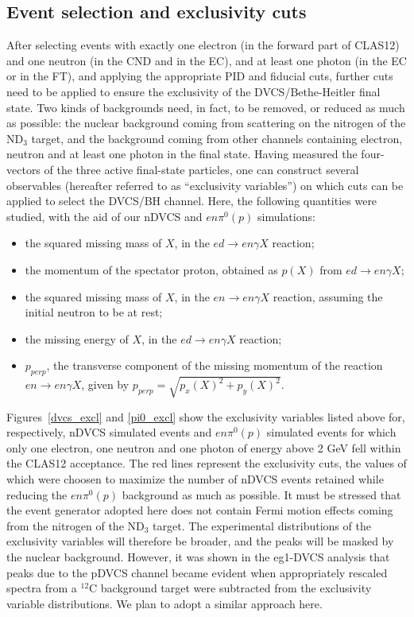 \subsection{Event selection and exclusivity cuts}\label{sec_excl_cuts}
After selecting events with exactly one electron (in the forward part of CLAS12) and one neutron (in the CND and in the EC), and at least one photon (in the EC or in the FT), and applying the appropriate PID and fiducial cuts, further cuts need to be applied to ensure the exclusivity of the DVCS/Bethe-Heitler final state. Two kinds of backgrounds need, in fact, to be removed, or reduced as much as possible: the nuclear background coming from scattering on the nitrogen of the ND$_3$ target, and the background coming from other channels containing electron, neutron and at least one photon in the final state. Having measured the four-vectors of the three active final-state particles, one can construct several observables (hereafter referred to as ``exclusivity variables'') on which cuts can be applied to select the DVCS/BH channel. Here, the following quantities were studied, with the aid of our nDVCS and $en\pi^0(p)$ simulations:
\begin{itemize}
\item{the squared missing mass of $X$, in the $ed\to en\gamma X$ reaction;}
\item{the momentum of the spectator proton, obtained as $p(X)$ from $ed\to en\gamma X$;}
\item{the squared missing mass of $X$, in the $en\to en\gamma X$ reaction, assuming the initial neutron to be at rest;}
\item{the missing energy of $X$, in the $ed\to en\gamma X$ reaction;}
\item{$p_{perp}$, the transverse component of the missing momentum of the reaction $en\to en\gamma X$, given by $p_{perp}=\sqrt{p_x(X)^2+p_y(X)^2}$.}
\end{itemize}

Figures~\ref{dvcs_excl} and \ref{pi0_excl} show the exclusivity variables listed above for, respectively, nDVCS simulated events and $en\pi^0(p)$ simulated events for which only one electron, one neutron and one photon of energy above 2 GeV fell within the CLAS12 acceptance. The red lines represent the exclusivity cuts, the values of which were choosen to maximize the number of nDVCS events retained while reducing the $en\pi^0(p)$ background as much as possible. It must be stressed that the event generator adopted here does not contain Fermi motion effects coming from the nitrogen of the ND$_3$ target. The experimental distributions of the exclusivity variables will therefore be broader, and the peaks will be masked by the nuclear background. 
However, it was shown in the eg1-DVCS analysis \cite{pisano} that peaks due to the pDVCS channel became evident when appropriately rescaled spectra from a $^{12}$C background target were subtracted from the exclusivity variable distributions.  We plan to adopt a similar approach here.

